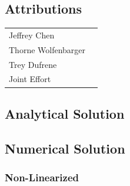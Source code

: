 \documentclass[12pt]{report}
\begin{document}
\begin{flushleft}
\subsection{Attributions}

\onehalfspacing
\begin{tabular}{ll}
Jeffrey Chen & \\
Thorne Wolfenbarger & \\
Trey Dufrene & \\
Joint Effort &
\end{tabular}
\singlespacing

\subsection{Analytical Solution}
\newpage
\subsection{Numerical Solution} \label{appendix:numerical}
\subsubsection{Non-Linearized}


\end{flushleft}
\end{document}
